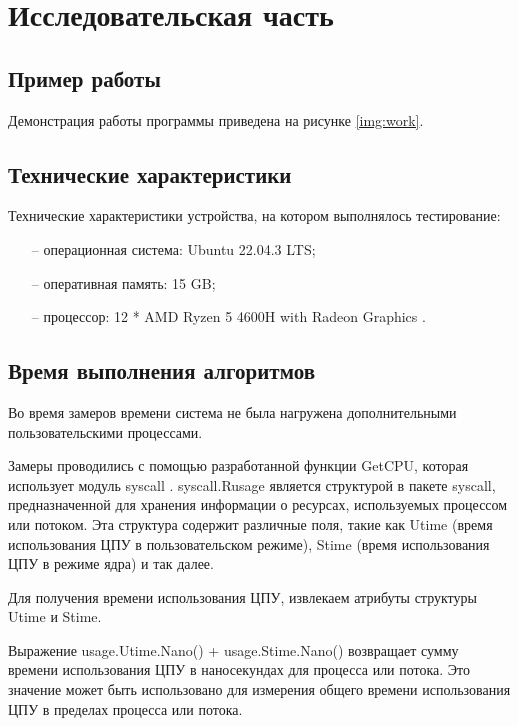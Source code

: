 \chapter{Исследовательская часть}

\section{Пример работы}

Демонстрация работы программы приведена на рисунке \ref{img:work}.


\section{Технические характеристики}

Технические характеристики устройства, на котором выполнялось тестирование:

\begin{itemize}
	\item[--] операционная система: Ubuntu \cite{ubuntu} 22.04.3 LTS;
	\item[--] оперативная память: 15 GB;
	\item[--] процессор: 12 * AMD Ryzen 5 4600H with Radeon Graphics \cite{amd}.
\end{itemize}


\section{Время выполнения алгоритмов}

Во время замеров времени система не была нагружена дополнительными пользовательскими процессами.

Замеры проводились с помощью разработанной функции GetCPU, которая использует модуль syscall \cite{syscall}. syscall.Rusage является структурой в пакете syscall, предназначенной для хранения информации о ресурсах, используемых процессом или потоком. Эта структура содержит различные поля, такие как Utime (время использования ЦПУ в пользовательском режиме), Stime (время использования ЦПУ в режиме ядра) и так далее.

Для получения времени использования ЦПУ, извлекаем атрибуты структуры Utime и Stime.

Выражение usage.Utime.Nano() + usage.Stime.Nano() возвращает сумму времени использования ЦПУ в наносекундах для процесса или потока. Это значение может быть использовано для измерения общего времени использования ЦПУ в пределах процесса или потока.

